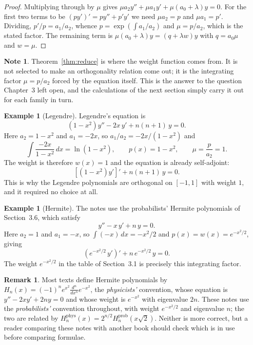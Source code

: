 \documentclass[12pt,a4paper]{report}
\theoremstyle{definition}
\newtheorem{exa}[thm]{Example}
\newtheorem{note}[thm]{Note}
\newtheorem{remark}[thm]{Remark}
\theoremstyle{plain}
\begin{document}
\begin{proof}
Multiplying through by $\mu$ gives
$\mu a_2 y'' + \mu a_1 y' + \mu(a_0+\lambda)y = 0$. For the first two terms to
be $\left(py'\right)' = py''+p'y'$ we need $\mu a_2 = p$ and $\mu a_1 = p'$.
Dividing, $p'/p = a_1/a_2$, whence
$p = \exp\left(\int a_1/a_2\right)$ and $\mu = p/a_2$, which is the stated
factor. The remaining term is $\mu(a_0+\lambda)y = \left(q+\lambda w\right)y$
with $q=a_0\mu$ and $w=\mu$.
\end{proof}

\begin{note}
Theorem~\ref{thm:reduce} is where the weight function comes from. It is not
selected to make an orthogonality relation come out; it is the integrating
factor $\mu = p/a_2$ forced by the equation itself. This is the answer to the
question Chapter~3 left open, and the calculations of the next section simply
carry it out for each family in turn.
\end{note}

\begin{exa}[Legendre]
Legendre's equation is
$$\left(1-x^{2}\right)y'' - 2x\,y' + n(n+1)\,y = 0 .$$
Here $a_2 = 1-x^{2}$ and $a_1 = -2x$, so
$a_1/a_2 = -2x/(1-x^{2})$ and
$$\int\frac{-2x}{1-x^{2}}\,dx = \ln\left(1-x^{2}\right),
\qquad p(x) = 1-x^{2},\qquad \mu = \frac{p}{a_2} = 1 .$$
The weight is therefore $w(x)=1$ and the equation is already self-adjoint:
$$\left[\left(1-x^{2}\right)y'\right]' + n(n+1)\,y = 0 .$$
This is why the Legendre polynomials are orthogonal on $[-1,1]$ with weight $1$,
and it required no choice at all.
\end{exa}

\begin{exa}[Hermite]
The notes use the probabilists' Hermite polynomials of Section~3.6, which
satisfy
$$y'' - x\,y' + n\,y = 0 .$$
Here $a_2=1$ and $a_1=-x$, so
$\int(-x)\,dx = -x^{2}/2$ and $p(x) = w(x) = e^{-x^{2}/2}$, giving
$$\left(e^{-x^{2}/2}\,y'\right)' + n\,e^{-x^{2}/2}\,y = 0 .$$
The weight $e^{-x^{2}/2}$ in the table of Section~3.1 is precisely this
integrating factor.
\end{exa}

\begin{remark}
Most texts define Hermite polynomials by
$H_n(x)=(-1)^n e^{x^{2}}\frac{d^n}{dx^n}e^{-x^{2}}$, the \emph{physicists'}
convention, whose equation is $y''-2xy'+2ny=0$ and whose weight is
$e^{-x^{2}}$ with eigenvalue $2n$. These notes use the \emph{probabilists'}
convention throughout, with weight $e^{-x^{2}/2}$ and eigenvalue $n$; the two
are related by $H_n^{\text{phys}}(x)=2^{n/2}H_n^{\text{prob}}(x\sqrt2)$. Neither
is more correct, but a reader comparing these notes with another book should
check which is in use before comparing formulae.
\end{remark}
\end{document}
